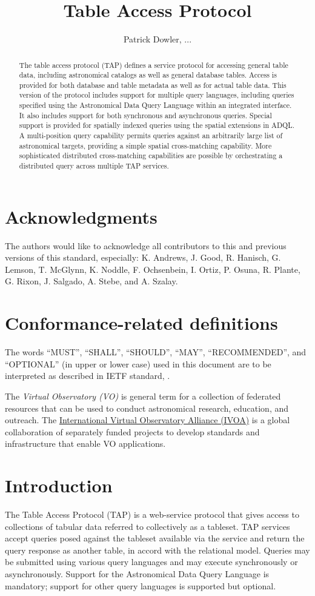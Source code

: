 \documentclass[11pt,letter]{ivoa}
\title{Table Access Protocol}
\author{Patrick Dowler, ...}
\begin{document}
\begin{abstract}
The table access protocol (TAP) defines a service protocol for accessing general 
table data, including astronomical catalogs as well as general database tables. 
Access is provided for both database and table metadata as well as for actual 
table data. This version of the protocol includes support for multiple query 
languages, including queries specified using the Astronomical Data Query 
Language \citep{std:ADQL} within an integrated interface. It also includes 
support 
for both synchronous and asynchronous queries. Special support is provided for
spatially indexed queries using the spatial extensions in ADQL. A multi-position 
query capability permits queries against an arbitrarily large list of 
astronomical targets, providing a simple spatial cross-matching capability. 
More sophisticated distributed cross-matching capabilities are possible by 
orchestrating a distributed query across multiple TAP services.  
\end{abstract}


\section*{Acknowledgments}

The authors would like to acknowledge all contributors to this and previous 
versions of this standard, especially: K. Andrews, J. Good, R. Hanisch, G. 
Lemson, T. McGlynn, K. Noddle, F. Ochsenbein, I. Ortiz, P. Osuna, R. Plante, G. 
Rixon, J. Salgado, A. Stebe, and A. Szalay.


\section*{Conformance-related definitions}

The words ``MUST'', ``SHALL'', ``SHOULD'', ``MAY'', ``RECOMMENDED'', and
``OPTIONAL'' (in upper or lower case) used in this document are to be
interpreted as described in IETF standard, \citet{std:RFC2119}.

The \emph{Virtual Observatory (VO)} is general term for a collection of 
federated resources that can be used to conduct astronomical research, 
education, and outreach. The \href{http://www.ivoa.net}{International
Virtual Observatory Alliance (IVOA)} is a global collaboration of separately 
funded projects to develop standards and infrastructure that enable VO 
applications.


\section{Introduction}
The Table Access Protocol (TAP) is a web-service protocol that gives access to 
collections of tabular data referred to collectively as a tableset.  TAP 
services accept queries posed against the tableset available via the service and 
return the query response as another table, in accord with the relational model. 
 Queries may be submitted using various query languages and may execute 
synchronously or asynchronously. Support for the Astronomical Data Query 
Language \citep{std:ADQL} is mandatory; support for other query languages is 
supported 
but optional.
\end{document}
